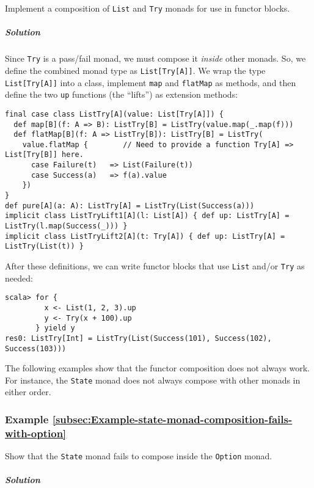 Implement a composition of \lstinline!List! and \lstinline!Try!
monads for use in functor blocks.

\subparagraph{Solution}

Since \lstinline!Try! is a pass/fail monad, we must compose it \emph{inside}
other monads. So, we define the combined monad type as \lstinline!List[Try[A]]!.
We wrap the type \lstinline!List[Try[A]]! into a class, implement
\lstinline!map! and \lstinline!flatMap! as methods, and then define
the two \lstinline!up! functions (the \textsf{``}lifts\textsf{''}) as extension methods:
\begin{lstlisting}
final case class ListTry[A](value: List[Try[A]]) {
  def map[B](f: A => B): ListTry[B] = ListTry(value.map(_.map(f)))
  def flatMap[B](f: A => ListTry[B]): ListTry[B] = ListTry(
    value.flatMap {        // Need to provide a function Try[A] => List[Try[B]] here.
      case Failure(t)   => List(Failure(t))
      case Success(a)   => f(a).value
    })
}
def pure[A](a: A): ListTry[A] = ListTry(List(Success(a)))
implicit class ListTryLift1[A](l: List[A]) { def up: ListTry[A] = ListTry(l.map(Success(_))) }
implicit class ListTryLift2[A](t: Try[A]) { def up: ListTry[A] = ListTry(List(t)) }
\end{lstlisting}
After these definitions, we can write functor blocks that use \lstinline!List!
and/or \lstinline!Try! as needed:
\begin{lstlisting}
scala> for {
         x <- List(1, 2, 3).up
         y <- Try(x + 100).up
       } yield y
res0: ListTry[Int] = ListTry(List(Success(101), Success(102), Success(103)))
\end{lstlisting}

The following examples show that the functor composition does not
always work. For instance, the \lstinline!State! monad does not always
compose with other monads in either order.

\subsubsection{Example \label{subsec:Example-state-monad-composition-fails-with-option}\ref{subsec:Example-state-monad-composition-fails-with-option}}

Show that the \lstinline!State! monad fails to compose inside the
\lstinline!Option! monad.

\subparagraph{Solution}

